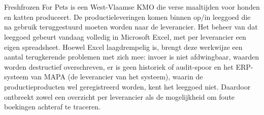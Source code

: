 
%
%
%
%
%

%



\chapter*{}

Freshfrozen For Pets is een West-Vlaamse KMO die verse maaltijden voor honden en katten produceert. De productieleveringen komen binnen op/in leeggoed die na gebruik teruggestuurd moeten worden naar de leverancier. Het beheer van dat leeggoed gebeurt vandaag volledig in Microsoft Excel, met per leverancier een eigen spreadsheet. Hoewel Excel laagdrempelig is, brengt deze werkwijze een aantal terugkerende problemen met zich mee: invoer is niet afdwingbaar, waarden worden destructief overschreven, er is geen historiek of audit-spoor en het ERP-systeem van MAPA (de leverancier van het systeem), waarin de productieproducten wel geregistreerd worden, kent het leeggoed niet. Daardoor ontbreekt zowel een overzicht per leverancier als de mogelijkheid om foute boekingen achteraf te traceren.

